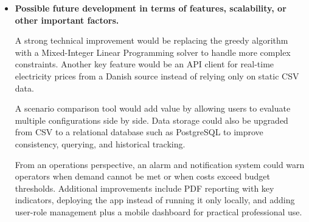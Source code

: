 \begin{itemize}
    \item \textbf{Possible future development in terms of features, scalability, or other important factors.}
    \par\hspace*{1.5em}A strong technical improvement would be replacing the greedy algorithm with a Mixed-Integer Linear Programming solver to handle more complex constraints. Another key feature would be an API client for real-time electricity prices from a Danish source instead of relying only on static CSV data.
    \par\hspace*{1.5em}A scenario comparison tool would add value by allowing users to evaluate multiple configurations side by side. Data storage could also be upgraded from CSV to a relational database such as PostgreSQL to improve consistency, querying, and historical tracking.
    \par\hspace*{1.5em}From an operations perspective, an alarm and notification system could warn operators when demand cannot be met or when costs exceed budget thresholds. Additional improvements include PDF reporting with key indicators, deploying the app instead of running it only locally, and adding user-role management plus a mobile dashboard for practical professional use.

\end{itemize}
